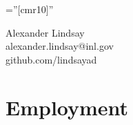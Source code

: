 \documentclass[a4paper,10pt]{article} %
\begin{document}
\pagestyle{empty} %

\font\fb=''[cmr10]'' %

\begin{center}
\Large Alexander Lindsay\\
alexander.lindsay@inl.gov\\
github.com/lindsayad\\
\end{center}


\section{Employment}
\end{document}
